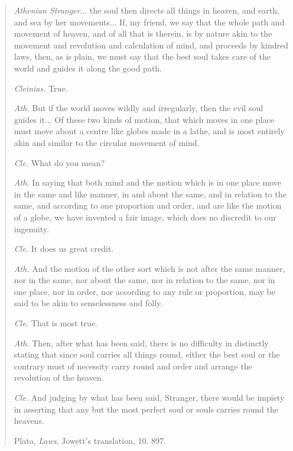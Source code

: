 \documentclass[a4paper, 11pt, oneside, polutonikogreek, english]{article}
\begin{document}
\clearpage
\vspace*{\fill}
\begin{quotation}\small
\emph{Athenian Stranger}... the soul then directs all things in heaven, and earth, and sea by her movements... If, my friend, we say that the whole path and movement of heaven, and of all that is therein, is by nature akin to the movement and revolution and calculation of mind, and proceeds by kindred laws, then, as is plain, we must say that the best soul takes care of the world and guides it along the good path.

\emph{Cleinias.} True.

\emph{Ath.} But if the world moves wildly and irregularly, then the evil soul guides it... Of these two kinds of motion, that which moves in one place must move about a centre like globes made in a lathe, and is most entirely akin and similar to the circular movement of mind.

\emph{Cle.} What do you mean?

\emph{Ath.} In saying that both mind and the motion which is in one place move in the same and like manner, in and about the same, and in relation to the same, and according to one proportion and order, and are like the motion of a globe, we have invented a fair image, which does no discredit to our ingenuity.

\emph{Cle.} It does us great credit.

\emph{Ath.} And the motion of the other sort which is not after the same manner, nor in the same, nor about the same, nor in relation to the same, nor in one place, nor in order, nor according to any rule or proportion, may be said to be akin to senselessness and folly.

\emph{Cle.} That is most true.

\emph{Ath.} Then, after what has been said, there is no difficulty in distinctly stating that since soul carries all things round, either the best soul or the contrary must of necessity carry round and order and arrange the revolution of the heaven.

\emph{Cle.} And judging by what has been said, Stranger, there would be impiety in asserting that any but the most perfect soul or souls carries round the heavens.

\bigskip

\hspace*{45mm}Plato, \emph{Laws}, Jowett's translation, 10. 897.
\end{quotation}
\end{document}
